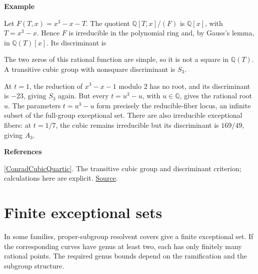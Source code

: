 \documentclass[11pt,a4paper,oneside,openany]{book}
\newcommand{\atlasdisplay}[1]{\par\begingroup\centering\vspace{3pt}\noindent\adjustbox{max width=\linewidth}{\(\displaystyle #1\)}\par\vspace{5pt}\endgroup}
\newenvironment{sources}{\par\smallskip\begingroup\footnotesize\color{atlasgray}\leftskip=10pt\setlength{\parskip}{2pt}}{\par\endgroup\smallskip}
\begin{document}
\begin{atlasblock}[standard]
\textbf{\sffamily Example}\par\smallskip
\color{black} Let \(F(T,x)=x^3-x-T\). The quotient \(\mathbb Q[T,x]/(F)\) is \(\mathbb Q[x]\), with \(T=x^3-x\). Hence \(F\) is irreducible in the polynomial ring and, by Gauss's lemma, in \(\mathbb Q(T)[x]\). Its discriminant is\par

\atlasdisplay{\Delta(T)=4-27T^2.}
\color{black} The two zeros of this rational function are simple, so it is not a square in \(\mathbb Q(T)\). A transitive cubic group with nonsquare discriminant is \(S_3\).\par
\color{black} At \(t=1\), the reduction of \(x^3-x-1\) modulo \(2\) has no root, and its discriminant is \(-23\), giving \(S_3\) again. But every \(t=u^3-u\), with \(u\in\mathbb Q\), gives the rational root \(u\). The parameters \(t=u^3-u\) form precisely the reducible-fiber locus, an infinite subset of the full-group exceptional set. There are also irreducible exceptional fibers: at \(t=1/7\), the cubic remains irreducible but its discriminant is \(169/49\), giving \(A_3\).\par
\end{atlasblock}\color{black}
\begin{sources}
\textbf{References}\par\smallskip
\noindent\hyperlink{ref:ConradCubicQuartic}{[ConradCubicQuartic]}. The transitive cubic group and discriminant criterion; calculations here are explicit. \href{https://kconrad.math.uconn.edu/blurbs/galoistheory/cubicquartic.pdf}{Source}.\par
\end{sources}\color{black}
\section{Finite exceptional sets}
\color{black} In some families, proper-subgroup resolvent covers give a finite exceptional set. If the corresponding curves have genus at least two, each has only finitely many rational points. The required genus bounds depend on the ramification and the subgroup structure.\par
\end{document}
